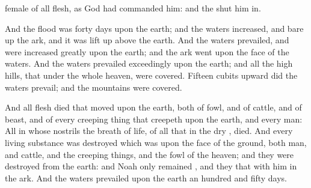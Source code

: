 {female of all
flesh, as
God had
commanded him: and the
{} shut him
in.
\par }{\PP {}And the
flood was
forty
days upon the
earth; and the
waters
increased, and bare
up the
ark, and it was lift
up above the
earth.
And the
waters
prevailed, and were
increased
greatly upon the
earth; and the
ark
went upon the
face of the
waters.
And the
waters
prevailed
exceedingly upon the
earth; and all the
high
hills, that
{}
under the whole
heaven, were
covered.
Fifteen
cubits
upward did the
waters
prevail; and the
mountains were
covered.
\par }{\PP {}And all
flesh
died that
moved upon the
earth, both of
fowl, and of
cattle, and of
beast, and of every creeping
thing that
creepeth upon the
earth, and every
man:
All in whose
nostrils
{} the
breath of
life, of all that
{} in the
dry
{},
died.
And every living
substance was
destroyed which was upon the
face of the
ground, both
man, and
cattle, and the creeping
things, and the
fowl of the
heaven; and they were
destroyed from the
earth: and
Noah
only
remained
{}, and they
that
{} with him in the
ark.
And the
waters
prevailed upon the
earth an
hundred and
fifty
days.

}
